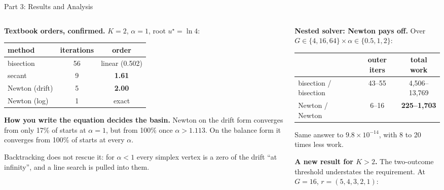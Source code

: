 \documentclass[aspectratio=169,10pt]{beamer}
\newcommand{\hit}[1]{\textcolor{mOrange}{\textbf{#1}}}
\newcommand{\good}[1]{\textcolor{mGreen!60!black}{#1}}
\newcommand{\bad}[1]{\textcolor{mRed}{#1}}
\begin{document}
\begin{frame}{Part 3: Results and Analysis}

\footnotesize
\begin{columns}[T,onlytextwidth]
\begin{column}{0.46\textwidth}
\textbf{Textbook orders, confirmed.} $K=2$, $\alpha=1$, root $u^\star=\ln4$:

\centering
{\scriptsize
\begin{tabular}{@{}lcc@{}}
\toprule
method & iterations & order \\
\midrule
bisection & 56 & linear (0.502) \\
secant    &  9 & \hit{1.61} \\
Newton (drift)   & 5 & \hit{2.00} \\
Newton (log)     & 1 & exact \\
\bottomrule
\end{tabular}}

\raggedright\smallskip
\medskip
\textbf{How you write the equation decides the basin.}
Newton on the drift form converges from only \bad{17\%} of starts at $\alpha=1$,
but from 100\% once $\alpha>1.113$. On the balance form it converges from
\good{100\%} of starts at every $\alpha$.

\medskip
Backtracking does not rescue it: for $\alpha<1$ every simplex vertex is a zero of
the drift ``at infinity'', and a line search is pulled into them.
\end{column}

\begin{column}{0.5\textwidth}
\textbf{Nested solver: Newton pays off.} Over $G\in\{4,16,64\}\times\alpha\in\{0.5,1,2\}$:

\centering
{\scriptsize
\begin{tabular}{@{}lcc@{}}
\toprule
 & outer iters & total work \\
\midrule
bisection / bisection & 43--55 & 4{,}506--13{,}769 \\
Newton / Newton       & 6--16  & \hit{225--1{,}703} \\
\bottomrule
\end{tabular}}

\raggedright\smallskip
Same answer to $9.8\times10^{-14}$, with 8 to 20 times less work.

\medskip
\textbf{A new result for $K>2$.} The two-outcome threshold understates the
requirement. At $G=16$, $r=(5,4,3,2,1)$:


\end{column}
\end{columns}
\end{frame}
\end{document}
